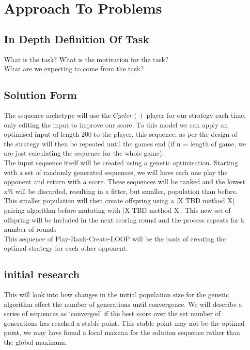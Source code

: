 
\chapter{Approach To Problems}\label{ch:approach}
\section{In Depth Definition Of Task}
What is the task?
What is the motivation for the task?\\

What are we expecting to come from the task?

\section{Solution Form}
The sequence archetype will use the \(Cycler()\) player for our strategy each time, only editing the input to improve our score.
To this model we can apply an optimised input of length 200 to the player, this sequence, as per the design of the strategy will then be repeated until the games end (if n = length of game, we are just calculating the sequence for the whole game).\\

The input sequence itself will be created using a genetic optimisation. Starting with a set of randomly generated sequences, we will have each one play the opponent and return with a score. 
These sequences will be ranked and the lowest x\% will be discarded, resulting in a fitter, but smaller, population than before. 
This smaller population will then create offspring using a |X TBD method X| pairing algorithm before mutating with |X TBD method X|. This new set of offspring will be included in the next scoring round and the process repeats for k number of rounds\\

This sequence of Play-Rank-Create-LOOP will be the basis of creating the optimal strategy for each other opponent.

\section{initial research}
This will look into how changes in the initial population size for the genetic algorithm effect the number of generations until convergence. 
We will describe a series of sequences as `converged' if the best score over the set number of generations has reached a stable point. This stable point may not be the optimal point, we may have found a local maxima for the solution sequence rather than the global maximum. \\

